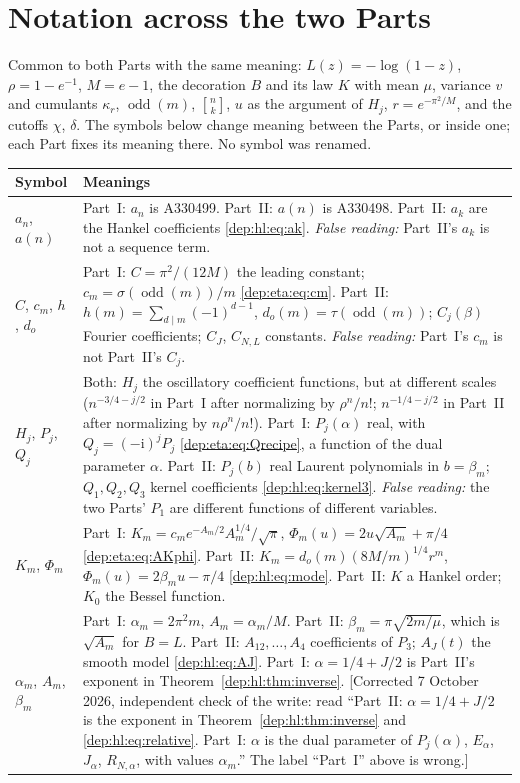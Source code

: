 \documentclass[11pt]{article}
\theoremstyle{definition}\newtheorem{definition}[theorem]{Definition}
\theoremstyle{remark}\newtheorem{remark}[theorem]{Remark}
\newcommand{\odd}{\operatorname{odd}}
\newcommand{\stir}[2]{\genfrac{[}{]}{0pt}{}{#1}{#2}}
\newcommand{\ii}{\mathrm i}
\begin{document}
\section*{Notation across the two Parts}\label{dep:sec:notation}
Common to both Parts with the same meaning: $L(z)=-\log(1-z)$, $\rho=1-e^{-1}$,
$M=e-1$, the decoration $B$ and its law $K$ with mean $\mu$, variance $v$ and
cumulants $\kappa_r$, $\odd(m)$, $\stir nk$, $u$ as the argument of $H_j$,
$r=e^{-\pi^2/M}$, and the cutoffs $\chi$, $\delta$. The symbols below change
meaning between the Parts, or inside one; each Part fixes its meaning there.
No symbol was renamed.
\begingroup\small
\renewcommand{\theHtable}{notation.\arabic{table}}
\begin{longtable}{@{}>{\raggedright\arraybackslash}p{} >{\raggedright\arraybackslash}p{}@{}}
\toprule
Symbol & Meanings\\
\midrule
\endhead
$a_n$, $a(n)$ & Part~I: $a_n$ is A330499. Part~II: $a(n)$ is A330498. Part~II: $a_k$ are the Hankel coefficients \eqref{dep:hl:eq:ak}. \emph{False reading:} Part~II's $a_k$ is not a sequence term.\\
$C$, $c_m$, $h$, $d_o$ & Part~I: $C=\pi^2/(12M)$ the leading constant; $c_m=\sigma(\odd(m))/m$ \eqref{dep:eta:eq:cm}. Part~II: $h(m)=\sum_{d\mid m}(-1)^{d-1}$, $d_o(m)=\tau(\odd(m))$; $C_j(\beta)$ Fourier coefficients; $C_J$, $C_{N,L}$ constants. \emph{False reading:} Part~I's $c_m$ is not Part~II's $C_j$.\\
$H_j$, $P_j$, $Q_j$ & Both: $H_j$ the oscillatory coefficient functions, but at different scales ($n^{-3/4-j/2}$ in Part~I after normalizing by $\rho^n/n!$; $n^{-1/4-j/2}$ in Part~II after normalizing by $n\rho^n/n!$). Part~I: $P_j(\alpha)$ real, with $Q_j=(-\ii)^jP_j$ \eqref{dep:eta:eq:Qrecipe}, a function of the dual parameter $\alpha$. Part~II: $P_j(b)$ real Laurent polynomials in $b=\beta_m$; $Q_1,Q_2,Q_3$ kernel coefficients \eqref{dep:hl:eq:kernel3}. \emph{False reading:} the two Parts' $P_1$ are different functions of different variables.\\
$K_m$, $\Phi_m$ & Part~I: $K_m=c_me^{-A_m/2}A_m^{1/4}/\sqrt\pi$, $\Phi_m(u)=2u\sqrt{A_m}+\pi/4$ \eqref{dep:eta:eq:AKphi}. Part~II: $K_m=d_o(m)(8M/m)^{1/4}r^m$, $\Phi_m(u)=2\beta_mu-\pi/4$ \eqref{dep:hl:eq:mode}. Part~II: $K$ a Hankel order; $K_0$ the Bessel function.\\
$\alpha_m$, $A_m$, $\beta_m$ & Part~I: $\alpha_m=2\pi^2m$, $A_m=\alpha_m/M$. Part~II: $\beta_m=\pi\sqrt{2m/\mu}$, which is $\sqrt{A_m}$ for $B=L$. Part~II: $A_{12},\dots,A_4$ coefficients of $P_3$; $A_J(t)$ the smooth model \eqref{dep:hl:eq:AJ}. Part~I: $\alpha=1/4+J/2$ is Part~II's exponent in Theorem~\ref{dep:hl:thm:inverse}. [Corrected 7 October 2026, independent check of the write: read ``Part~II: $\alpha=1/4+J/2$ is the exponent in Theorem~\ref{dep:hl:thm:inverse} and \eqref{dep:hl:eq:relative}. Part~I: $\alpha$ is the dual parameter of $P_j(\alpha)$, $E_\alpha$, $J_\alpha$, $R_{N,\alpha}$, with values $\alpha_m$.'' The label ``Part~I'' above is wrong.]\\

\end{longtable}
\end{document}

